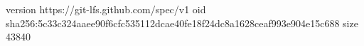 version https://git-lfs.github.com/spec/v1
oid sha256:5c33c324aaee90f6cfc535112dcae40fe18f24dc8a1628ceaf993e904e15c688
size 43840
